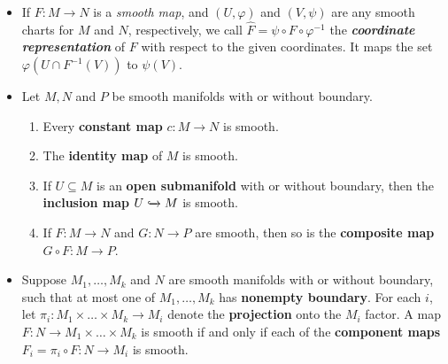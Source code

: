 \documentclass[11pt]{article}
\begin{document}
\begin{itemize}
\item 
\begin{definition}
If $F: M \rightarrow N$ is a \emph{smooth map}, and $(U, \varphi)$ and $(V, \psi)$ are any smooth charts for $M$ and $N$, respectively, we call $\widehat{F} = \psi \circ F \circ \varphi^{-1}$ the \emph{\textbf{coordinate representation}} of $F$ with respect to the given coordinates. It maps the set $\varphi(U\cap F^{-1}(V))$ to $\psi(V)$.
\end{definition}

\item 
\begin{proposition}
Let $M, N$ and $P$ be smooth manifolds with or without boundary.
\begin{enumerate}
\item Every \textbf{constant map} $c: M \rightarrow N$ is smooth.
\item The \textbf{identity map} of $M$ is smooth.
\item If $U \subseteq M$ is an \textbf{open submanifold} with or without boundary, then the \textbf{inclusion
map} $U \xhookrightarrow{} M$ is smooth.
\item If $F: M \rightarrow N$ and $G: N \rightarrow P$  are smooth, then so is the \textbf{composite map} $G \circ F: M \rightarrow P$.
\end{enumerate}
\end{proposition}

\item 
\begin{proposition}
Suppose $M_1 ,\ldots, M_k$ and $N$ are smooth manifolds with or without boundary, such that at most one of $M_1 ,\ldots, M_k$ has \textbf{nonempty boundary}. For each $i$, let $\pi_i: M_1 \times \ldots \times M_k \rightarrow M_i$ denote the \textbf{projection} onto the $M_i$ factor. A map $F: N \rightarrow M_1 \times \ldots \times M_k$ is smooth if and only if each of the \textbf{component maps} $F_i = \pi_i \circ F: N \rightarrow M_i$ is smooth.
\end{proposition}
\end{itemize}
\end{document}
